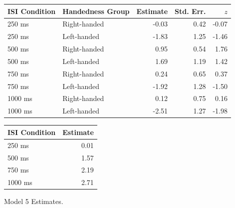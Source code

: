\documentclass[A4paper,man,floatsintext]{apa6}
\theoremstyle{definition}
\theoremstyle{definition}
\theoremstyle{definition}
\theoremstyle{remark}
\begin{document}
\begin{appendix}
\begin{table}[!p]
\begin{subtable}{\textwidth}
\begin{table}[H]
\begin{tabular}{llrrr}
\toprule
ISI Condition & Handedness Group & Estimate & Std. Err. & $z$\\
\midrule
250  ms & Right-handed & -0.03 & 0.42 & -0.07\\
250  ms & Left-handed & -1.83 & 1.25 & -1.46\\
500  ms & Right-handed & 0.95 & 0.54 & 1.76\\
500  ms & Left-handed & 1.69 & 1.19 & 1.42\\
750  ms & Right-handed & 0.24 & 0.65 & 0.37\\
750  ms & Left-handed & -1.92 & 1.28 & -1.50\\
1000 ms & Right-handed & 0.12 & 0.75 & 0.16\\
1000 ms & Left-handed & -2.51 & 1.27 & -1.98\\
\bottomrule
\end{tabular}\endgroup{}
\end{table}
\end{subtable}
\begin{subtable}{\textwidth}
\caption{Variance Component Estimates. Estimates are presented on the standard deviation scale. 12\% of the variance is estimated to be at the lab-level and 88\% at the group-level.}
\centering
\begin{table}[H]\centering\begingroup\fontsize{10}{12}\selectfont

\begin{tabular}{lr}
\toprule
ISI Condition & Estimate\\
\midrule
250 ms & 0.01\\
500 ms & 1.57\\
750 ms & 2.19\\
1000 ms & 2.71\\
\bottomrule
\end{tabular}\endgroup{}
\end{table}
\end{subtable}
\end{table}

\begin{table}[!p]
\caption{\label{tab:mod5}Model 5 Estimates.}
\begin{subtable}{\textwidth}
\centering
\begin{table}[H]\centering\begingroup\fontsize{10}{12}\selectfont


\end{table}
\end{subtable}
\end{table}
\end{appendix}
\end{document}
